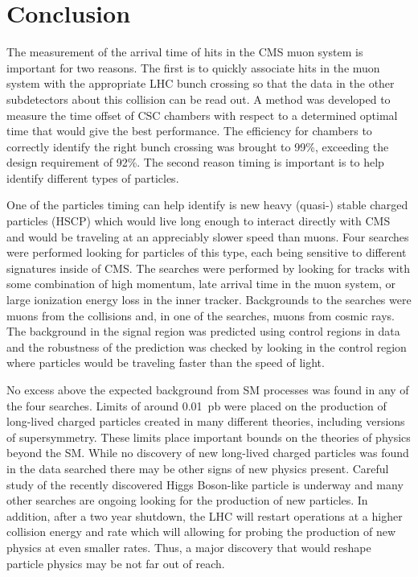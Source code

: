 \chapter{Conclusion \label{sec:conclusion}}

The measurement of the arrival time of hits in the CMS muon system is important for two reasons.
The first is to quickly associate hits in the muon system with the appropriate LHC bunch crossing so that the data in the other subdetectors about this
collision can be read out. A method was developed to measure the time offset of CSC chambers with respect to a determined optimal time that would give
the best performance. 
The efficiency for chambers to correctly identify the right bunch crossing was brought to 99\%,
exceeding the design requirement of 92\%. The second reason timing is important is to help identify different types of particles.

One of the particles timing can help identify is new heavy (quasi-) stable charged particles (HSCP) which would live long enough to interact directly with CMS
and would be traveling at an appreciably slower speed than muons. Four searches were performed looking
for particles of this type, each being sensitive to different signatures inside of CMS. 
The searches were performed by looking for tracks with some combination of high momentum, late arrival time in the muon system,
or large ionization energy loss in the inner tracker.
Backgrounds to the searches were muons from the collisions and, in one of the searches, muons from cosmic rays.
The background in the signal region was predicted using control regions in data and the 
robustness of the prediction was checked by looking in the control region where particles would be traveling faster than the speed of light.

No excess above the expected background from SM processes was found in any of the four searches. Limits of around 0.01~pb were placed on the production of long-lived charged
particles created in many different theories, including versions of supersymmetry. These limits place important bounds on the theories
of physics beyond the SM. While no discovery of new long-lived charged particles was found in the data searched there may be other signs of
new physics present. Careful study of the recently discovered Higgs Boson-like particle is underway and many other searches are ongoing looking for the production
of new particles. In addition, after a two year shutdown, the LHC will restart operations at a higher collision energy and rate which will allowing for probing
the production of new physics at even smaller rates. 
Thus, a major discovery that would reshape particle physics may be not far out of reach.
